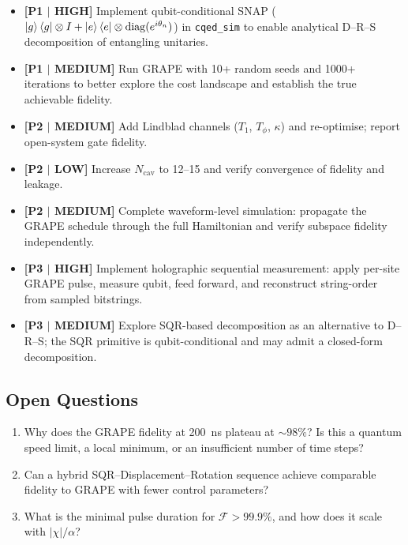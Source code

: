 \documentclass[aps,pra,twocolumn,reprint,floatfix,amsmath,amssymb]{revtex4-2}
\begin{document}
\begin{itemize}
  \item \textbf{[P1 $|$ HIGH]} Implement qubit-conditional SNAP
    ($\ket{g}\bra{g}\otimes I+\ket{e}\bra{e}\otimes\mathrm{diag}
    (e^{i\theta_n})$) in \texttt{cqed\_sim} to enable analytical
    D--R--S decomposition of entangling unitaries.

  \item \textbf{[P1 $|$ MEDIUM]} Run GRAPE with 10+ random seeds
    and 1000+ iterations to better explore the cost landscape and
    establish the true achievable fidelity.

  \item \textbf{[P2 $|$ MEDIUM]} Add Lindblad channels ($T_1$,
    $T_\phi$, $\kappa$) and re-optimise; report open-system gate
    fidelity.

  \item \textbf{[P2 $|$ LOW]} Increase $N_\mathrm{cav}$ to 12--15
    and verify convergence of fidelity and leakage.

  \item \textbf{[P2 $|$ MEDIUM]} Complete waveform-level simulation:
    propagate the GRAPE schedule through the full Hamiltonian and
    verify subspace fidelity independently.

  \item \textbf{[P3 $|$ HIGH]} Implement holographic sequential
    measurement: apply per-site GRAPE pulse, measure qubit, feed
    forward, and reconstruct string-order from sampled bitstrings.

  \item \textbf{[P3 $|$ MEDIUM]} Explore SQR-based decomposition
    as an alternative to D--R--S; the SQR primitive is
    qubit-conditional and may admit a closed-form decomposition.
\end{itemize}

\subsection{Open Questions}

\begin{enumerate}
  \item Why does the GRAPE fidelity at \SI{200}{ns} plateau at
    $\sim98\%$?  Is this a quantum speed limit, a local minimum,
    or an insufficient number of time steps?

  \item Can a hybrid SQR--Displacement--Rotation sequence achieve
    comparable fidelity to GRAPE with fewer control parameters?

  \item What is the minimal pulse duration for
    $\mathcal{F}>99.9\%$, and how does it scale with
    $|\chi|/\alpha$?
\end{enumerate}
\end{document}

